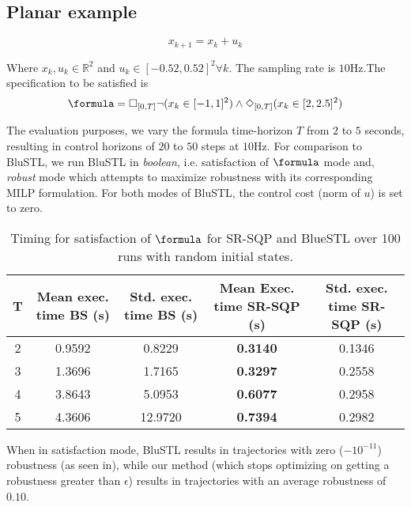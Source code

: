\subsection{Planar example}

\begin{equation}
x_{k+1} = x_k + u_k
\end{equation}

Where $x_k,u_k \in \mathbb{R}^2$ and $ u_k \in [-0.52,0.52]^2 \forall k$. The sampling rate is $10$Hz.The specification to be satisfied is
\begin{equation}
\formula = \always_{[0,T]} \neg (x_k \in [-1,1]^2) \land \eventually_{[0,T]} (x_k \in [2,2.5]^2)
\end{equation}

The evaluation purposes, we vary the formula time-horizon $T$ from $2$ to $5$ seconds, resulting in control horizons of $20$ to $50$ steps at $10$Hz. For comparison to BluSTL, we run BluSTL in \textit{boolean}, i.e. satisfaction of $\formula$ mode and, \textit{robust} mode which attempts to maximize robustness with its corresponding MILP formulation. For both modes of BluSTL, the control cost (norm of $u$) is set to zero.

\begin{table}[htb]
\small
\begin{center}
\caption{{\small Timing for satisfaction of $\formula$ for SR-SQP and BlueSTL over 100 runs with random initial states.}}
\vspace{-10pt}
\label{tbl:opt_performance}
\begin{tabular} {|c|c|c|c|c|}
	\hline
	\textbf{T} & Mean exec. time BS (s) & Std. exec. time BS (s) &  Mean Exec. time SR-SQP (s) & Std. exec. time SR-SQP (s)\\ \hline
	2 & 0.9592 & 0.8229 & \textbf{0.3140} & 0.1346 \\ \hline
	3 & 1.3696 & 1.7165 & \textbf{0.3297} & 0.2558\\ \hline
	4 & 3.8643 & 5.0953  & \textbf{0.6077} & 0.2958\\ \hline
	5 & 4.3606 & 12.9720  & \textbf{0.7394} & 0.2982\\ \hline
\end{tabular}	
\end{center}
\vspace{-20pt}
\end{table}

When in satisfaction mode, BluSTL results in trajectories with zero ($-10^{-11}$) robustness (as seen in), while our method (which stops optimizing on getting a robustness greater than $\epsilon$) results in trajectories with an average robustness of $0.10$. 

